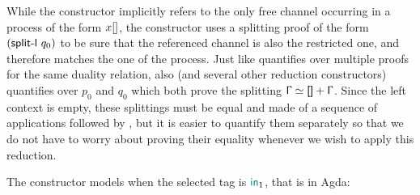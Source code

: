 \begin{AgdaAlign}
While the  constructor implicitly refers to the
only free channel occurring in a process of the form $x[]$, the
 constructor uses a splitting proof of the form
$(\AgdaInductiveConstructor{split-l}~q_0)$ to be sure that the referenced
channel is also the restricted one, and therefore matches the one of the
 process.
%
Just like  quantifies over multiple proofs for
the same duality relation, also  (and several
other reduction constructors) quantifies over $p_0$ and $q_0$ which both prove
the splitting $\Context \simeq \AgdaInductiveConstructor{[]} + \Context$. Since
the left context is empty, these splittings must be equal and made of a sequence
of  applications followed by
, but it is easier to quantify them separately
so that we do not have to worry about proving their equality whenever we wish to
apply this reduction.

The constructor  models \RSelect when the
selected tag is $\mathsf{\color{teal}in}_1$, that is  in Agda:


\end{AgdaAlign}
